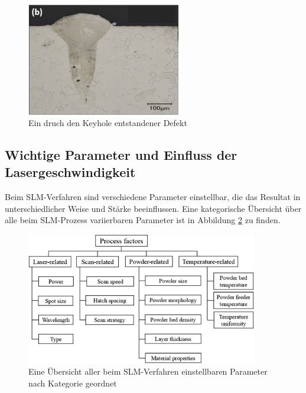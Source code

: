		\begin{figure}[!ht]
			\centering
			\includegraphics[width=0.6\textwidth]{chapter/main/img/defects/keyhole.png}
			\caption{Ein druch den Keyhole entstandener Defekt \cite{eskandarisabzi2019defect}}
			\label{fig:defects_keyholes}
		\end{figure}

	\subsection{Wichtige Parameter und Einfluss der Lasergeschwindigkeit}
		Beim SLM-Verfahren sind verschiedene Parameter einstellbar, die das Resultat in
		unterschiedlicher Weise und Stärke beeinflussen. Eine kategorische Übersicht über alle
		beim SLM-Prozess variierbaren Parameter ist in Abbildung \ref{fig:scheme_parameters} zu
		finden.

		\begin{figure}[!ht]
			\centering
			\includegraphics[width=0.9\textwidth]{chapter/main/img/scheme_parameters_2.png}
			\caption{Eine Übersicht aller beim SLM-Verfahren einstellbaren Parameter nach
			Kategorie geordnet \cite{zhang2017defect,aboulkhair2014reducing}}
			\label{fig:scheme_parameters}
		\end{figure}

